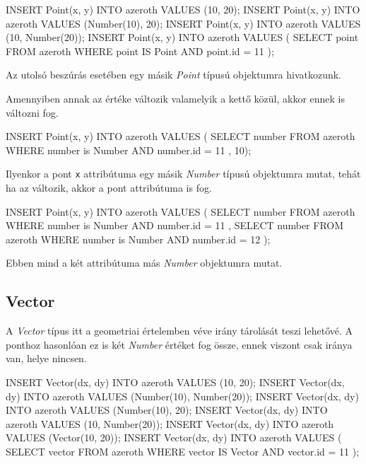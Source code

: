 \begin{sql}
INSERT Point(x, y) INTO azeroth VALUES (10, 20);
INSERT Point(x, y) INTO azeroth VALUES (Number(10), 20);
INSERT Point(x, y) INTO azeroth VALUES (10, Number(20));
INSERT Point(x, y) INTO azeroth VALUES (
{ SELECT point FROM azeroth
  WHERE point IS Point AND point.id = 11 });
\end{sql}

Az utolsó beszúrás esetében egy másik \textit{Point} típusú objektumra hivatkozunk.

\noindent Amennyiben annak az értéke változik valamelyik a kettő közül, akkor ennek is változni fog.

\begin{sql}
INSERT Point(x, y) INTO azeroth VALUES ({
  SELECT number FROM azeroth
  WHERE number is Number AND number.id = 11 }, 10);
\end{sql}

Ilyenkor a pont \texttt{x} attribútuma egy másik \textit{Number} típusú objektumra mutat, tehát ha az változik, akkor a pont attribútuma is fog.

\begin{sql}
INSERT Point(x, y) INTO azeroth VALUES (
    { SELECT number FROM azeroth
    WHERE number is Number AND number.id = 11 },
    { SELECT number FROM azeroth
    WHERE number is Number AND number.id = 12 }
);
\end{sql}

Ebben mind a két attribútuma más \textit{Number} objektumra mutat.

\subsection{Vector}

A \textit{Vector} típus itt a geometriai értelemben véve irány tárolását teszi lehetővé. A ponthoz hasonlóan ez is két \textit{Number} értéket fog össze, ennek viszont csak iránya van, helye nincsen.

\begin{sql}
INSERT Vector(dx, dy) INTO azeroth VALUES (10, 20);
INSERT Vector(dx, dy) INTO azeroth VALUES (Number(10), Number(20));
INSERT Vector(dx, dy) INTO azeroth VALUES (Number(10), 20);
INSERT Vector(dx, dy) INTO azeroth VALUES (10, Number(20));
INSERT Vector(dx, dy) INTO azeroth VALUES (Vector(10, 20));
INSERT Vector(dx, dy) INTO azeroth VALUES (
{ SELECT vector FROM azeroth WHERE vector IS Vector AND vector.id = 11 }
);
\end{sql}

